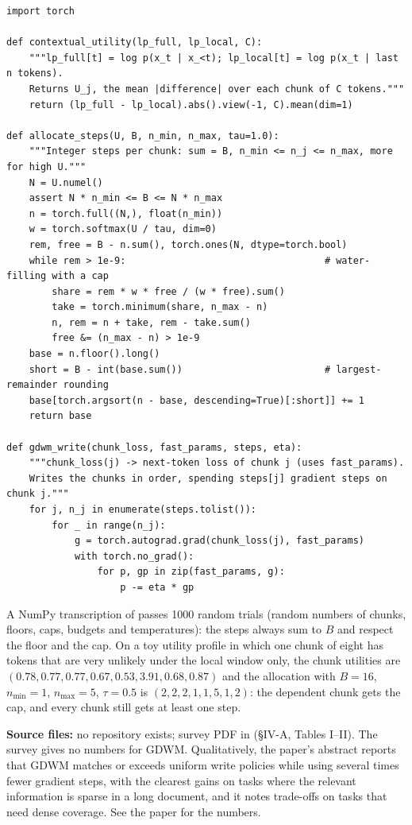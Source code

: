 \begin{lstlisting}[caption={Reference implementation (ours): a GDWM-style write controller. Not the authors' code.},label={lst:c09-gdwm}]
import torch

def contextual_utility(lp_full, lp_local, C):
    """lp_full[t] = log p(x_t | x_<t); lp_local[t] = log p(x_t | last n tokens).
    Returns U_j, the mean |difference| over each chunk of C tokens."""
    return (lp_full - lp_local).abs().view(-1, C).mean(dim=1)

def allocate_steps(U, B, n_min, n_max, tau=1.0):
    """Integer steps per chunk: sum = B, n_min <= n_j <= n_max, more for high U."""
    N = U.numel()
    assert N * n_min <= B <= N * n_max
    n = torch.full((N,), float(n_min))
    w = torch.softmax(U / tau, dim=0)
    rem, free = B - n.sum(), torch.ones(N, dtype=torch.bool)
    while rem > 1e-9:                                   # water-filling with a cap
        share = rem * w * free / (w * free).sum()
        take = torch.minimum(share, n_max - n)
        n, rem = n + take, rem - take.sum()
        free &= (n_max - n) > 1e-9
    base = n.floor().long()
    short = B - int(base.sum())                         # largest-remainder rounding
    base[torch.argsort(n - base, descending=True)[:short]] += 1
    return base

def gdwm_write(chunk_loss, fast_params, steps, eta):
    """chunk_loss(j) -> next-token loss of chunk j (uses fast_params).
    Writes the chunks in order, spending steps[j] gradient steps on chunk j."""
    for j, n_j in enumerate(steps.tolist()):
        for _ in range(n_j):
            g = torch.autograd.grad(chunk_loss(j), fast_params)
            with torch.no_grad():
                for p, gp in zip(fast_params, g):
                    p -= eta * gp
\end{lstlisting}

A NumPy transcription of  passes 1000 random trials (random numbers of
chunks, floors, caps, budgets and temperatures): the steps always sum to $B$ and respect the
floor and the cap. On a toy utility profile in which one chunk of eight has tokens that are
very unlikely under the local window only, the chunk utilities are
$(0.78, 0.77, 0.77, 0.67, 0.53, 3.91, 0.68, 0.87)$ and the allocation with $B = 16$,
$n_{\min} = 1$, $n_{\max} = 5$, $\tau = 0.5$ is $(2,2,2,1,1,5,1,2)$: the dependent chunk gets
the cap, and every chunk still gets at least one step.

\begin{results}
\textbf{Source files:} no repository exists; survey PDF in  (\S IV-A, Tables
I--II). The survey gives no numbers for GDWM. Qualitatively, the paper's abstract reports that
GDWM matches or exceeds uniform write policies while using several times fewer gradient steps,
with the clearest gains on tasks where the relevant information is sparse in a long document,
and it notes trade-offs on tasks that need dense coverage. See the paper for the numbers.
\end{results}


